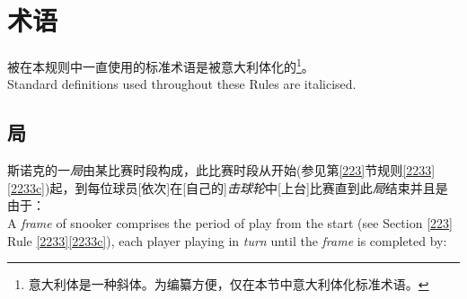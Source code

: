 \section{术语}\label{222}

\noindent 被在本规则中一直使用的标准术语是被意大利体化的\footnote{意大利体是一种斜体。为编纂方便，仅在本节中意大利体化标准术语。}。\\
Standard definitions used throughout these Rules are italicised.

\subsection{局}\label{2221}

\noindent 斯诺克的一\textit{局}由某比赛时段构成，此比赛时段从开始(参见第\ref{223}节规则\ref{2233}\ref{2233c})起，到每位球员[依次]在[自己的]\textit{击球轮}中[上台]比赛直到此\textit{局}结束并且是由于：\\
A \textit{frame} of snooker comprises the period of play from the start (see Section \ref{223} Rule \ref{2233}\ref{2233c}), each player playing in \textit{turn} until the \textit{frame} is completed by:
